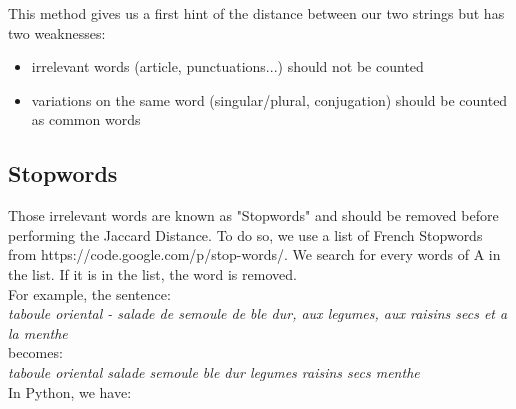 \documentclass{article}
\begin{document}
This method gives us a first hint of the distance between our two strings but has two weaknesses:
\begin{itemize}
\item irrelevant words (article, punctuations...) should not be counted
\item variations on the same word (singular/plural, conjugation) should be counted as common words
\end{itemize}

	\subsection{Stopwords}
Those irrelevant words are known as "Stopwords" and should be removed before performing the Jaccard Distance.
To do so, we use a list of French Stopwords from https://code.google.com/p/stop-words/.
We search for every words of A in the list. If it is in the list, the word is removed.
\\
For example, the sentence:
\\
\textit{taboule oriental - salade de semoule de ble dur, aux legumes, aux raisins secs et a la menthe}
\\
becomes:
\\
\textit{taboule oriental salade semoule ble dur legumes raisins secs menthe}
\\
In Python, we have:
\end{document}
